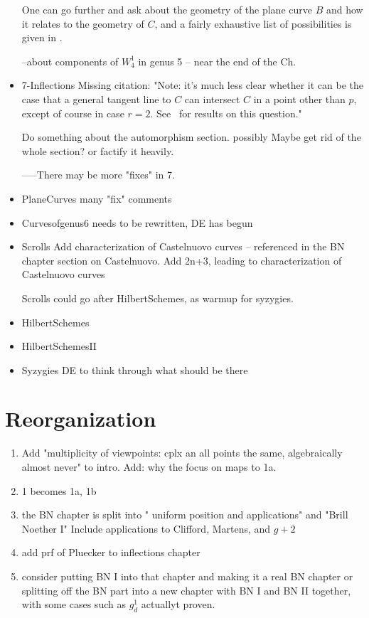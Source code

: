 \documentclass[12pt, leqno]{book}
\begin{document}
\begin{itemize}
 One can go further and ask about the geometry of the plane curve $B$ and how it relates to the geometry of $C$, and a fairly exhaustive list of possibilities is given in \cite{ACGH}. 

--about components of $W^1_4$ in genus 5 -- near the end of the Ch.

\item{7-Inflections}  Missing citation: "Note: it's much less clear whether it can be the case that a general tangent line to $C$ can intersect $C$ in a point other than $p$, except of course in case $r=2$. See~\cite{} for results on this question."

Do something about the automorphism section.  possibly 
Maybe get rid of the whole section? or factify it heavily.

-----There may be more "fixes" in 7.

\item{PlaneCurves}
many "fix" comments

\item{Curvesofgenus6}
needs to be rewritten, DE has begun

\item{Scrolls}
Add characterization of Castelnuovo curves -- referenced in the BN chapter section on Castelnuovo.
Add 2n+3, leading to characterization of Castelnuovo curves

Scrolls could go after HilbertSchemes, as warmup for syzygies.

\item{HilbertSchemes}
\item{HilbertSchemesII}

\item{Syzygies}
DE to think through what should be there

\end{itemize}


\section{Reorganization}

\begin{enumerate}
\item Add "multiplicity of viewpoints: cplx an all points the same, algebraically almost never" to intro.
Add: why the focus on maps to 1a.

 \item 1 becomes 1a, 1b
 \item the BN chapter is split into
" uniform position and applications" and "Brill Noether I" Include applications to Clifford, Martens, and $g+2$
\item add prf of Pluecker to inflections chapter
\item consider putting BN I into that chapter and making it a real BN chapter or splitting off the BN part
into a new chapter with BN I and BN II together, with some cases such as $g^1_d$ actuallyt proven.

\end{enumerate}
\end{document}
